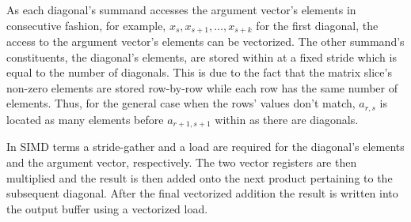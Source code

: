 \documentclass{article}
\begin{document}
      As each diagonal's summand accesses the argument vector's elements in consecutive fashion, for example, $x_s, x_{s+1}, \ldots, x_{s + k}$ for the first diagonal, the access to the argument vector's elements can be vectorized. The other summand's constituents, the diagonal's elements, are stored within \V at a fixed stride which is equal to the number of diagonals. This is due to the fact that the matrix slice's non-zero elements are stored row-by-row while each row has the same number of elements. Thus, for the general case when the rows' values don't match, $a_{r, s}$ is located as many elements before $a_{r+1, s+1}$ within \V as there are diagonals.

      In SIMD terms a stride-gather and a load are required for the diagonal's elements and the argument vector, respectively. The two vector registers are then multiplied and the result is then added onto the next product pertaining to the subsequent diagonal. After the final vectorized addition the result is written into the output buffer using a vectorized load.
\end{document}
